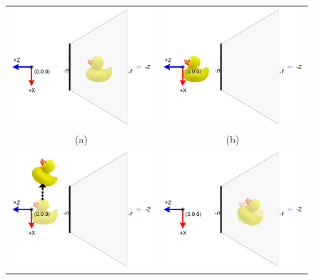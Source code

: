 \begin{figure}
\centering
\begin{tabular}{|c|c|}
\hline
\includegraphics[width=0.45\linewidth,keepaspectratio=true]{figs/scene01.png}
&
\includegraphics[width=0.45\linewidth,keepaspectratio=true]{figs/scene02.png}
\\
(a)&(b)\\ \hline
\includegraphics[width=0.45\linewidth,keepaspectratio=true]{figs/scene03.png}
&
\includegraphics[width=0.45\linewidth,keepaspectratio=true]{figs/scene04.png}
\\ 

\end{tabular}
\end{figure}

